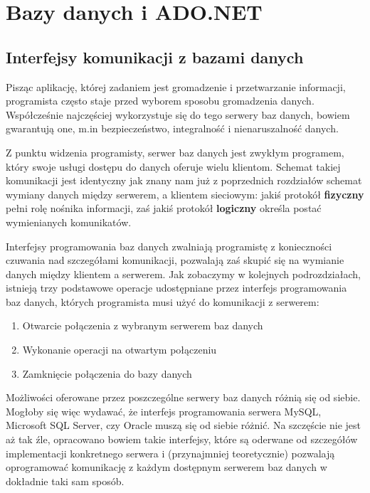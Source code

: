 ﻿\section{Bazy danych i ADO.NET}

\subsection{Interfejsy komunikacji z bazami danych}

Pisząc aplikację, której zadaniem jest gromadzenie i przetwarzanie informacji, programista
często staje przed wyborem sposobu gromadzenia danych. Współcześnie najczęściej wykorzystuje się
do tego serwery baz danych, bowiem gwarantują one, m.in bezpieczeństwo, integralność i nienaruszalność danych.

Z punktu widzenia programisty, serwer baz danych jest zwykłym programem, który swoje usługi dostępu do danych
oferuje wielu klientom. Schemat takiej komunikacji jest identyczny jak znany nam już z poprzednich rozdziałów
schemat wymiany danych między serwerem, a klientem sieciowym: jakiś protokół {\bf fizyczny} pełni rolę
nośnika informacji, zaś jakiś protokół {\bf logiczny} określa postać wymienianych komunikatów.

Interfejsy programowania baz danych zwalniają programistę z konieczności czuwania nad szczegółami
komunikacji, pozwalają zaś skupić się na wymianie danych między klientem a serwerem. Jak zobaczymy
w kolejnych podrozdziałach, istnieją trzy podstawowe operacje udostępniane przez interfejs
programowania baz danych, których programista musi użyć do komunikacji z serwerem:
\begin{enumerate}
\item Otwarcie połączenia z wybranym serwerem baz danych
\item Wykonanie operacji na otwartym połączeniu
\item Zamknięcie połączenia do bazy danych
\end{enumerate}

Możliwości oferowane przez poszczególne serwery baz danych różnią się od siebie. Mogłoby się więc wydawać, że
interfejs programowania serwera MySQL, Microsoft SQL Server, czy Oracle muszą się od siebie różnić. Na szczęście
nie jest aż tak źle, opracowano bowiem takie interfejsy, które są oderwane od
szczegółów implementacji konkretnego serwera i (przynajmniej teoretycznie) pozwalają oprogramować komunikację z 
każdym dostępnym serwerem baz danych w dokładnie taki sam sposób.

